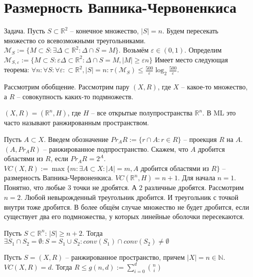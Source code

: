\documentclass[document.tex]{subfiles}
\begin{document}
\section{Размерность Вапника-Червоненкиса}
\begin{example}
    Задача. Пусть $S \subset \mathbb{R}^2$ -- конечное множество, $|S| = n$. Будем пересекать множество со всевозможными
    треугольниками. $\mathcal{M}_S := \{M \subset S: \exists \Delta \subset \mathbb{R}^2: \Delta \cap S = M\}$. Возьмём
    $\varepsilon \in (0, 1)$. Определим $\mathcal{M}_{S, \varepsilon} := \{ M \subset S: \varepsilon \Delta \subset
        \mathbb{R}^2: \Delta \cap S = M, |M| \geq \varepsilon n\}$
    Имеет место следующая теорема: $\forall n: \forall S: \forall \varepsilon: \subset \mathbb{R}^2, |S| = n:
    \tau(\mathcal{M}_S) \leq \frac{500}{\varepsilon} \log_2 \frac{500}{\varepsilon}$.
\end{example}

Рассмотрим обобщение.
Рассмотрим пару $(X, R)$, где $X$ -- какое-то множество, а $R$ -- совокупность каких-то подмножеств.

\begin{example}
    $(X, R) = (\mathbb{R}^n, H)$, где $H$ -- все открытые полупространства $\mathbb{R}^n$. В ML это часто называют
    ранжированным пространством.
\end{example}

Пусть $A \subset X$. Введем обозначение $Pr_A R := \{r \cap A: r \in R\}$ -- проекция $R$ на $A$. $(A, Pr_A R)$ --
ранжированное подпространство. Скажем, что $A$ дробится областями из $R$, если $Pr_A R = 2^A$. $VC(X, R) := \max \{m :
\exists A \subset X: |A| = m, A \text{ дробится областями из } R\}$ -- размерность Вапника-Червоненкиса.
$VC(\mathbb{R}^n, H) = n + 1$. Для начала $n = 1$. Понятно, что любые $3$ точки не дробятся. А 2 различные дробятся.
Рассмотрим $n = 2$. Любой невырожденный треугольник дробится. И треугольник с точкой внутри тоже дробится. В более
общём случае множество не будет дробится, если существует два его подмножества, у которых линейные оболочки
пересекаются.

\begin{theorem}[Радона]
    Пусть $S \subset \mathbb{R}^n$: $|S| \geq n + 2$. Тогда $\exists S_1 \cap S_2 = \emptyset: S = S_1 \cup S_2:
    conv(S_1) \cap conv(S_2) \neq \emptyset$
\end{theorem}

\begin{lemma}
    Пусть $S = (X, R)$ -- ранжированное пространство, причем $|X| = n \in \mathbb{N}$. $VC(X, R) = d$. Тогда $R \leq
    g(n, d) := \sum_{i = 0}^{d} \binom{n}{i}$
\end{lemma}
\end{document}
